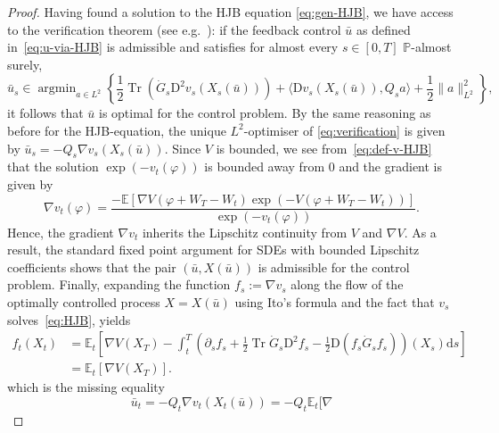\documentclass[11pt, a4paper]{scrartcl}
\numberwithin{equation}{section}
\theoremstyle{plain}
\theoremstyle{remark}
\newcommand{\assign}{:=}
\newcommand{\mathD}{\mathrm{D}}
\newcommand{\mathd}{\mathrm{d}}
\newcommand{\tmop}[1]{\ensuremath{\operatorname{#1}}}
\begin{document}
\begin{proof}
  Having found a solution to the HJB equation \eqref{eq:gen-HJB}, we have
  access to the verification theorem (see
  e.g.~{\cite[Theorem~2.36]{fabbriStochasticOptimalControl2017}}): if the
  feedback control $\bar{u}$ as defined in~\eqref{eq:u-via-HJB} is admissible
  and satisfies for almost every $s \in [0, T]$ $\mathbb{P}$-almost surely,
  \begin{equation}
    \bar{u}_s \in \tmop{argmin}_{a \in L^2} \left\{ \frac{1}{2} \tmop{Tr}
    (\dot{G}_s \mathD^2 v_s (X_s (\bar{u}))) + \langle \mathD v_s (X_s
    (\bar{u})), Q_s a \rangle + \frac{1}{2} \| a \|^2_{L^2} \right\}, \label{eq:verification}
  \end{equation}
  it follows that $\bar{u}$ is optimal for the control problem. By the same
  reasoning as before for the HJB-equation, the unique $L^2$-optimiser of
  \eqref{eq:verification} is given by $\bar{u}_s = - Q_s \nabla v_s (X_s
  (\bar{u}))$. Since $V$ is bounded, we see from~\eqref{eq:def-v-HJB} that the
  solution $\exp (- v_t (\varphi))$ is bounded away from $0$ and the gradient
  is given by
  \begin{equation}
    \nabla v_t (\varphi) = \frac{-\mathbb{E} [\nabla V (\varphi + W_T - W_t)
    \exp (- V (\varphi + W_T - W_t))]}{\exp (- v_t (\varphi))} .
    \label{eq:gradv-HJB}
  \end{equation}
  Hence, the gradient $\nabla v_t$ inherits the Lipschitz continuity from $V$
  and $\nabla V$. As a result, the standard fixed point argument for SDEs with
  bounded Lipschitz coefficients shows that the pair $(\bar{u}, X (\bar{u}))$
  is admissible for the control problem. Finally, expanding the function $f_s
  \assign \nabla v_s$ along the flow of the optimally controlled process $X =
  X (\bar{u})$ using Ito's formula and the fact that $v_s$
  solves~\eqref{eq:HJB}, yields
  \begin{equation}
    \begin{aligned}
      f_t (X_t) 
      &=\mathbb{E}_t \left[ \nabla V (X_T) - \int_t^T \left( \partial_s
      f_s + \frac{1}{2} \tmop{Tr} \dot{G}_s \mathD^2 f_s - \frac{1}{2} \mathD
      (f_s  \dot{G}_s f_s) \right) (X_s) \mathd s \right]\\ 
      &=\mathbb{E}_t [\nabla
      V (X_T)] .
    \end{aligned} \label{eq:flow-exact-sol}
  \end{equation}
  which is the missing equality
  \begin{equation}
    \bar{u}_t = - Q_t \nabla v_t (X_t (\bar{u})) = - Q_t \mathbb{E}_t [\nabla

\end{equation}
\end{proof}
\end{document}
